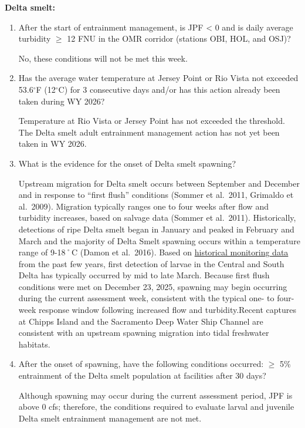 \documentclass[
  letterpaper,
  DIV=11,
  numbers=noendperiod]{scrartcl}
\begin{document}
\textbf{Delta smelt:}

\begin{enumerate}
\def\labelenumi{\arabic{enumi}.}
\item
  After the start of entrainment management, is JPF \textless{} 0 and is
  daily average turbidity \(\ge\) 12 FNU in the OMR corridor (stations
  OBI, HOL, and OSJ)?

  No, these conditions will not be met this week.
\item
  Has the average water temperature at Jersey Point or Rio Vista not
  exceeded 53.6\(^{\circ}\)F (12\(^{\circ}\)C) for 3 consecutive days
  and/or has this action already been taken during WY 2026?

  Temperature at Rio Vista or Jersey Point has not exceeded the
  threshold. The Delta smelt adult entrainment management action has not
  yet been taken in WY 2026.
\item
  What is the evidence for the onset of Delta smelt spawning?

  Upstream migration for Delta smelt occurs between September and
  December and in response to ``first flush'' conditions (Sommer et
  al.~2011, Grimaldo et al.~2009). Migration typically ranges one to
  four weeks after flow and turbidity increases, based on salvage data
  (Sommer et al.~2011). Historically, detections of ripe Delta smelt
  began in January and peaked in February and March and the majority of
  Delta Smelt spawning occurs within a temperature range of 9-18˚C
  (Damon et al.~2016). Based on
  \href{https://github.com/Delta-Stewardship-Council/deltafish}{historical
  monitoring data} from the past few years, first detection of larvae in
  the Central and South Delta has typically occurred by mid to late
  March. Because first flush conditions were met on December 23, 2025,
  spawning may begin occurring during the current assessment week,
  consistent with the typical one- to four-week response window
  following increased flow and turbidity.Recent captures at Chipps
  Island and the Sacramento Deep Water Ship Channel are consistent with
  an upstream spawning migration into tidal freshwater habitats.
\item
  After the onset of spawning, have the following conditions occurred:
  \(\ge\) 5\% entrainment of the Delta smelt population at facilities
  after 30 days?

  Although spawning may occur during the current assessment period, JPF
  is above 0 cfs; therefore, the conditions required to evaluate larval
  and juvenile Delta smelt entrainment management are not met.
\end{enumerate}
\end{document}
